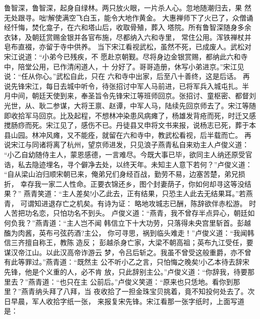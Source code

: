 鲁智深，鲁智深，起身自绿林。两只放火眼，一片杀人心。忽地随潮归去，果
然无处跟寻。咄!解使满空飞白玉，能令大地作黄金。
大惠禅师下了火已了，众僧诵经忏悔，焚化龛子，在六和塔山后，收取骨殖，葬入
塔院。所有鲁智深随身多余衣钵，及朝廷赏赐金银并各官布施，尽都纳入六和寺里，
常住公用。浑铁禅杖并皂布直裰，亦留于寺中供养。
当下宋江看视武松，虽然不死，已成废人。武松对宋江说道：“小弟今已残疾，不
愿赴京朝觐。尽将身边金银赏赐，都纳此六和寺中，陪堂公用，已作清闲道人，十
分好了。哥哥造册，休写小弟进京。”宋江见说：“任从你心。”武松自此，只在
六和寺中出家，后至八十善终，这是后话。
再说先锋宋江，每日去城中听令，待张招讨中军人马前进，已将军兵入城屯扎。半
月中间，朝廷天使到来，奉圣旨令先锋宋江等班师回京。张招讨、童枢密、都督刘
光世，从、耿二参谋，大将王禀、赵谭，中军人马，陆续先回京师去了。宋江等随
即收拾军马回京。比及起程，不想林冲染患风病瘫了，杨雄发背疮而死，时迁又感
搅肠痧而死。宋江见了，感伤不已。丹徒县又申将文书来报，说杨志已死，葬于本
县山园。林冲风瘫，又不能痊，就留在六和寺中，教武松看视，后半载而亡。
再说宋江与同诸将离了杭州，望京师进发，只见浪子燕青私自来劝主人卢俊义道：
“小乙自幼随侍主人，蒙恩感德，一言难尽。今既大事已毕，欲同主人纳还原受官
诰，私去隐迹埋名，寻个僻净去处，以终天年。未知主人意下若何？”卢俊义道：
“自从梁山泊归顺宋朝已来，俺弟兄们身经百战，勤劳不易，边塞苦楚，弟兄损折，
幸存我一家二人性命。正要衣锦还乡，图个封妻荫子，你如何却寻这等没结果？”
燕青笑道：“主人差矣!小乙此去，正有结果，只恐主人此去无结果耳。”若燕青，
可谓知进退存亡之机矣。有诗为证：
略地攻城志已酬，陈辞欲伴赤松游。
时人苦把功名恋，只怕功名不到头。
卢俊义道：“燕青，我不曾存半点异心，朝廷如何负我？”燕青道：“主人岂不闻
韩信立下十大功劳，只落得未央宫里斩首。彭越醢为肉酱，英布弓弦药酒?主公，
你可寻思，祸到临头难走！”卢俊义道：“我闻韩信三齐擅自称王，教陈造反；
彭越杀身亡家，大梁不朝高祖；英布九江受任，要谋汉帝江山。以此汉高帝诈游云
梦，令吕后斩之。我虽不曾受这般重爵，亦不曾有此等罪过。”燕青道：“既然主
公不听小乙之言，只怕悔之晚矣!小乙本待去辞宋先锋，他是个义重的人，必不肯
放，只此辞别主公。”卢俊义道：“你辞我，待要那里去？”燕青道：“也只在主
公前后。”卢俊义笑道：“原来也只恁地。看你到那里？”燕青纳头拜了八拜，当
夜收拾了一担金珠宝贝挑着，竟不知投何处去了。次日早晨，军人收拾字纸一张，
来报复宋先锋。宋江看那一张字纸时，上面写道是：

